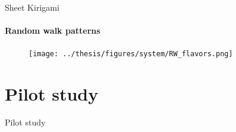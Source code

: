 \documentclass[
	10pt, %
]{beamer}
\renewcommand{\vec}[1]{\mathbf{#1}} %
\begin{document}
%
%
\begin{frame}{Sheet Kirigami}
	\framesubtitle{Random walk patterns}
	\begin{figure}[H]
		\centering
		\texttt{[image: ../thesis/figures/system/RW\_flavors.png]}
	\end{figure}
\end{frame}
%
%


\section{Pilot study} %
\begin{frame}{Pilot study}
    \tableofcontents[currentsection]
\end{frame}
\end{document}
